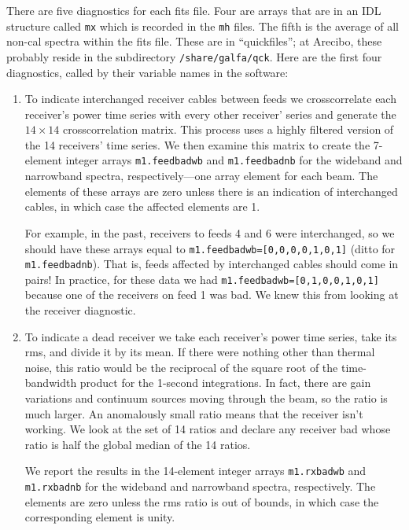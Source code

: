\documentclass[psfig,preprint]{aastex}
\begin{document}
	There are five diagnostics for each fits file.  Four are arrays
that are in an IDL structure called \verb$mx$ which is recorded in the
\verb$mh$ files.  The fifth is the average of all non-cal spectra within
the fits file.  These are in ``quickfiles''; at Arecibo, these probably
reside in the subdirectory \verb$/share/galfa/qck$.  Here are the first
four diagnostics, called by their variable names in the software:
\begin{enumerate}

	\item To indicate interchanged receiver cables between feeds we
crosscorrelate each receiver's power time series with every other
receiver' series and generate the $14 \times 14$ crosscorrelation
matrix.  This process uses a highly filtered version of the 14
receivers' time series.  We then examine this matrix to create the
7-element integer arrays \verb$m1.feedbadwb$ and \verb$m1.feedbadnb$ for
the wideband and narrowband spectra, respectively---one array element
for each beam.  The elements of these arrays are zero unless there is an
indication of interchanged cables, in which case the affected elements
are 1. 

	For example, in the past, receivers to feeds 4 and 6 were
interchanged, so we should have these arrays equal to
\verb$m1.feedbadwb=[0,0,0,0,1,0,1]$ (ditto for \verb$m1.feedbadnb$). 
That is, feeds affected by interchanged cables should come in pairs! In
practice, for these data we had \verb$m1.feedbadwb=[0,1,0,0,1,0,1]$
because one of the receivers on feed 1 was bad.  We knew this from
looking at the receiver diagnostic. 

	\item To indicate a dead receiver we take each receiver's power
time series, take its rms, and divide it by its mean.  If there were
nothing other than thermal noise, this ratio would be the reciprocal of
the square root of the time-bandwidth product for the 1-second
integrations.  In fact, there are gain variations and continuum sources
moving through the beam, so the ratio is much larger. An anomalously
small ratio means that the receiver isn't working. We look at the set of
14 ratios and declare any receiver bad whose ratio is half the global
median of the 14 ratios. 

	We report the results in the 14-element integer arrays
\verb$m1.rxbadwb$ and \verb$m1.rxbadnb$ for the wideband and narrowband
spectra, respectively. The elements are zero unless the rms ratio is out
of bounds, in which case the corresponding element is unity. 


\end{enumerate}
\end{document}
